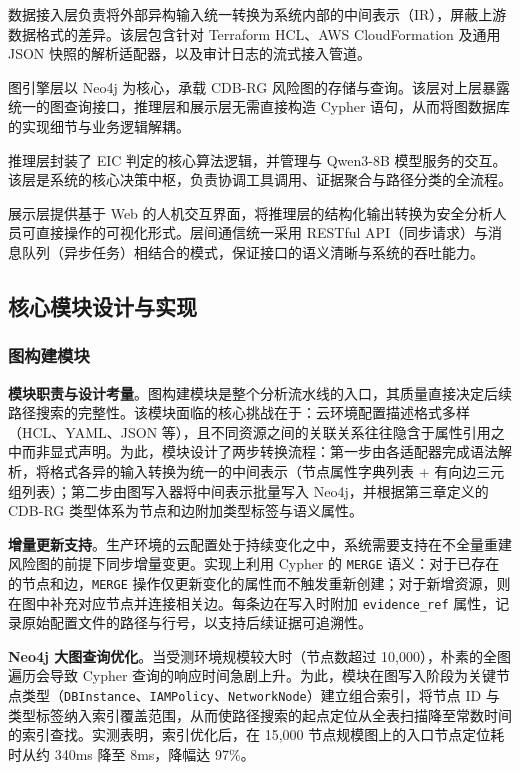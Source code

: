 \documentclass[a4paper,12pt]{ctexart}
\begin{document}
数据接入层负责将外部异构输入统一转换为系统内部的中间表示（IR），屏蔽上游数据格式的差异。该层包含针对 Terraform HCL、AWS CloudFormation 及通用 JSON 快照的解析适配器，以及审计日志的流式接入管道。

图引擎层以 Neo4j 为核心，承载 CDB-RG 风险图的存储与查询。该层对上层暴露统一的图查询接口，推理层和展示层无需直接构造 Cypher 语句，从而将图数据库的实现细节与业务逻辑解耦。

推理层封装了 EIC 判定的核心算法逻辑，并管理与 Qwen3-8B 模型服务的交互。该层是系统的核心决策中枢，负责协调工具调用、证据聚合与路径分类的全流程。

展示层提供基于 Web 的人机交互界面，将推理层的结构化输出转换为安全分析人员可直接操作的可视化形式。层间通信统一采用 RESTful API（同步请求）与消息队列（异步任务）相结合的模式，保证接口的语义清晰与系统的吞吐能力。

\subsection{核心模块设计与实现}

\subsubsection{图构建模块}

\textbf{模块职责与设计考量}。图构建模块是整个分析流水线的入口，其质量直接决定后续路径搜索的完整性。该模块面临的核心挑战在于：云环境配置描述格式多样（HCL、YAML、JSON 等），且不同资源之间的关联关系往往隐含于属性引用之中而非显式声明。为此，模块设计了两步转换流程：第一步由各适配器完成语法解析，将格式各异的输入转换为统一的中间表示（节点属性字典列表 + 有向边三元组列表）；第二步由图写入器将中间表示批量写入 Neo4j，并根据第三章定义的 CDB-RG 类型体系为节点和边附加类型标签与语义属性。

\textbf{增量更新支持}。生产环境的云配置处于持续变化之中，系统需要支持在不全量重建风险图的前提下同步增量变更。实现上利用 Cypher 的 \texttt{MERGE} 语义：对于已存在的节点和边，\texttt{MERGE} 操作仅更新变化的属性而不触发重新创建；对于新增资源，则在图中补充对应节点并连接相关边。每条边在写入时附加 \texttt{evidence\_ref} 属性，记录原始配置文件的路径与行号，以支持后续证据可追溯性。

\textbf{Neo4j 大图查询优化}。当受测环境规模较大时（节点数超过 10,000），朴素的全图遍历会导致 Cypher 查询的响应时间急剧上升。为此，模块在图写入阶段为关键节点类型（\texttt{DBInstance}、\texttt{IAMPolicy}、\texttt{NetworkNode}）建立组合索引，将节点 ID 与类型标签纳入索引覆盖范围，从而使路径搜索的起点定位从全表扫描降至常数时间的索引查找。实测表明，索引优化后，在 15,000 节点规模图上的入口节点定位耗时从约 340ms 降至 8ms，降幅达 97\%。
\end{document}
